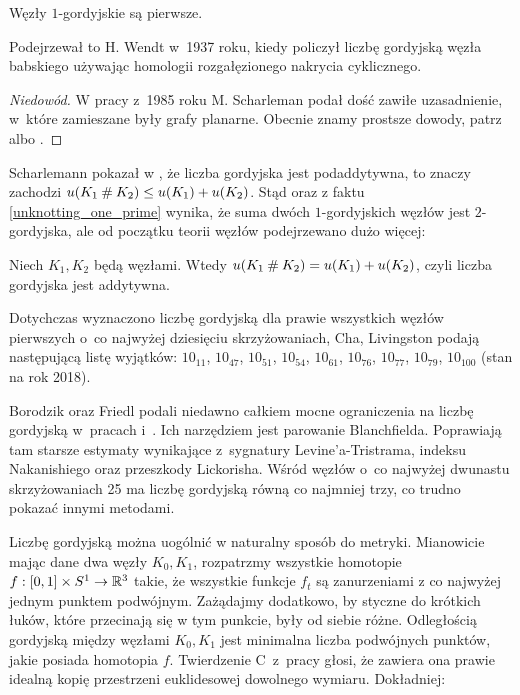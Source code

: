 \begin{proposition}
    \label{unknotting_one_prime}
    Węzły $1$-gordyjskie są pierwsze.
\end{proposition}

Podejrzewał to H. Wendt w~1937 roku, kiedy policzył liczbę gordyjską węzła babskiego używając homologii rozgałęzionego nakrycia cyklicznego.

\begin{proof}[Niedowód]
    W pracy \cite{scharleman85} z~1985 roku M. Scharleman podał dość zawiłe uzasadnienie, w~które zamieszane były grafy planarne.
    Obecnie znamy prostsze dowody, patrz \cite{lackenby97} albo \cite{zhang91}.
\end{proof}

Scharlemann pokazał w \cite[wniosek 1.6]{scharlemann98}, że liczba gordyjska jest podaddytywna, to znaczy zachodzi $u(K_1 \mathbin{\#} K_2) \le u(K_1) + u(K_2)$.
Stąd oraz z faktu \ref{unknotting_one_prime} wynika, że suma dwóch $1$-gordyjskich węzłów jest $2$-gordyjska, ale od początku teorii węzłów podejrzewano dużo więcej:

\begin{conjecture}
    Niech $K_1, K_2$ będą węzłami.
    Wtedy $u(K_1 \mathbin{\#} K_2) = u(K_1) + u(K_2)$, czyli liczba gordyjska jest addytywna.
\end{conjecture}

Dotychczas wyznaczono liczbę gordyjską dla prawie wszystkich węzłów pierwszych o~co najwyżej dziesięciu skrzyżowaniach,
Cha, Livingston \cite{cha05} podają następującą listę wyjątków:
$10_{11}$, $10_{47}$, $10_{51}$, $10_{54}$, $10_{61}$, $10_{76}$, $10_{77}$, $10_{79}$, $10_{100}$ (stan na rok 2018).

Borodzik oraz Friedl podali niedawno całkiem mocne ograniczenia na liczbę gordyjską w~pracach \cite{borodzik14} i~\cite{borodzik15}.
Ich narzędziem jest parowanie Blanchfielda.
Poprawiają tam starsze estymaty wynikające z~sygnatury Levine'a-Tristrama, indeksu Nakanishiego oraz przeszkody Lickorisha.
Wśród węzłów o~co najwyżej dwunastu skrzyżowaniach 25 ma liczbę gordyjską równą co najmniej trzy, co trudno pokazać innymi metodami.

Liczbę gordyjską można uogólnić w naturalny sposób do metryki.
Mianowicie mając dane dwa węzły $K_0, K_1$, rozpatrzmy wszystkie homotopie $f : [0,1] \times S^1 \to \mathbb R^3$ takie, że wszystkie funkcje $f_t$ są zanurzeniami z co najwyżej jednym punktem podwójnym.
Zażądajmy dodatkowo, by styczne do krótkich łuków, które przecinają się w tym punkcie, były od siebie różne.
Odległością gordyjską między węzłami $K_0, K_1$ jest minimalna liczba podwójnych punktów, jakie posiada homotopia $f$.
Twierdzenie C~z~pracy \cite{gambaudo05} głosi, że zawiera ona prawie idealną kopię przestrzeni euklidesowej dowolnego wymiaru.
Dokładniej:

